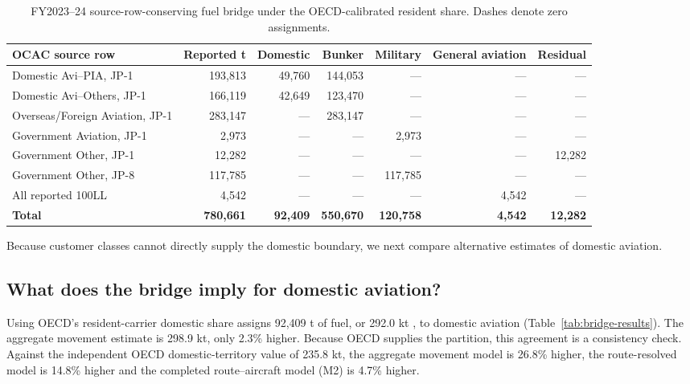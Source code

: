 \begin{table}[htbp]
\centering
\footnotesize
\begin{tabular}{@{}lrrrrrr@{}}
\toprule
\textbf{OCAC source row} & \textbf{Reported t} & \textbf{Domestic} & \textbf{Bunker} &
\textbf{Military} & \textbf{General aviation} & \textbf{Residual} \\
\midrule
Domestic Avi--PIA, JP-1 & 193,813 & 49,760 & 144,053 & --- & --- & --- \\
Domestic Avi--Others, JP-1 & 166,119 & 42,649 & 123,470 & --- & --- & --- \\
Overseas/Foreign Aviation, JP-1 & 283,147 & --- & 283,147 & --- & --- & --- \\
Government Aviation, JP-1 & 2,973 & --- & --- & 2,973 & --- & --- \\
Government Other, JP-1 & 12,282 & --- & --- & --- & --- & 12,282 \\
Government Other, JP-8 & 117,785 & --- & --- & 117,785 & --- & --- \\
All reported 100LL & 4,542 & --- & --- & --- & 4,542 & --- \\
\midrule
\textbf{Total} & \textbf{780,661} & \textbf{92,409} & \textbf{550,670} &
\textbf{120,758} & \textbf{4,542} & \textbf{12,282} \\
\bottomrule
\end{tabular}
\caption{FY2023--24 source-row-conserving fuel bridge under the OECD-calibrated resident
share. Dashes denote zero assignments.}
\label{tab:source-bridge}
\end{table}

Because customer classes cannot directly supply the domestic boundary, we next compare
alternative estimates of domestic aviation.

\subsection{What does the bridge imply for domestic aviation?}

Using OECD's resident-carrier domestic share assigns 92,409 t of fuel, or 292.0 kt \COtwo{},
to domestic aviation (Table~\ref{tab:bridge-results}). The aggregate movement estimate is
298.9 kt, only 2.3\% higher. Because OECD supplies the partition, this agreement is a
consistency check. Against the independent OECD domestic-territory value of
235.8 kt, the aggregate movement model is 26.8\% higher, the route-resolved model is 14.8\%
higher and the completed route--aircraft model (M2) is 4.7\% higher.

